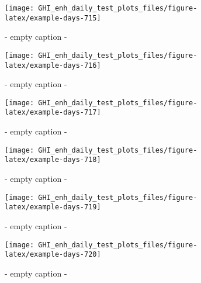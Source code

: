 \documentclass[
  10pt,
  a4paper,oneside]{article}
\begin{document}
\begin{figure}[H]

{\centering \texttt{[image: GHI\_enh\_daily\_test\_plots\_files/figure-latex/example-days-715]} 

}

\caption{ - empty caption - }\label{fig:example-days-715}
\end{figure}

\begin{figure}[H]

{\centering \texttt{[image: GHI\_enh\_daily\_test\_plots\_files/figure-latex/example-days-716]} 

}

\caption{ - empty caption - }\label{fig:example-days-716}
\end{figure}

\begin{figure}[H]

{\centering \texttt{[image: GHI\_enh\_daily\_test\_plots\_files/figure-latex/example-days-717]} 

}

\caption{ - empty caption - }\label{fig:example-days-717}
\end{figure}

\begin{figure}[H]

{\centering \texttt{[image: GHI\_enh\_daily\_test\_plots\_files/figure-latex/example-days-718]} 

}

\caption{ - empty caption - }\label{fig:example-days-718}
\end{figure}

\begin{figure}[H]

{\centering \texttt{[image: GHI\_enh\_daily\_test\_plots\_files/figure-latex/example-days-719]} 

}

\caption{ - empty caption - }\label{fig:example-days-719}
\end{figure}

\begin{figure}[H]

{\centering \texttt{[image: GHI\_enh\_daily\_test\_plots\_files/figure-latex/example-days-720]} 

}

\caption{ - empty caption - }\label{fig:example-days-720}
\end{figure}
\end{document}
